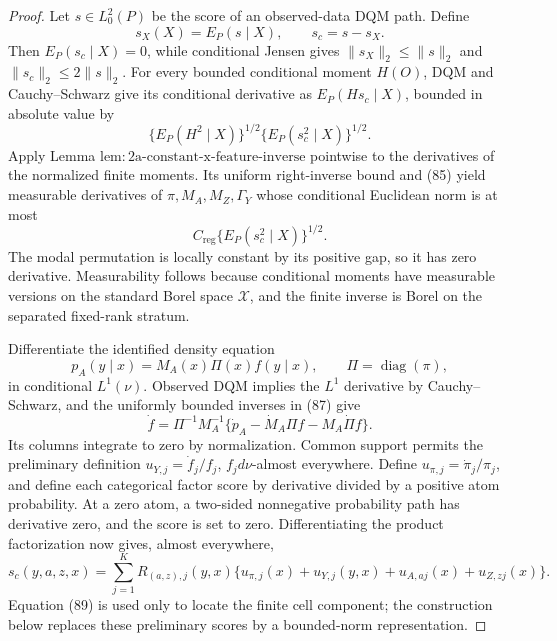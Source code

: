 \documentclass{article}
\begin{document}
\begin{proof}
Let \(s\in L^2_0(P)\) be the score of an observed-data DQM path.  Define
\[
 s_X(X)=E_P(s\mid X),\qquad s_c=s-s_X. \tag{84}
\]
Then \(E_P(s_c\mid X)=0\), while conditional Jensen gives
\(\|s_X\|_2\leq\|s\|_2\) and \(\|s_c\|_2\leq2\|s\|_2\).  For every bounded conditional moment \(H(O)\), DQM and Cauchy--Schwarz give its conditional derivative as \(E_P(Hs_c\mid X)\), bounded in absolute value by
\[
 \{E_P(H^2\mid X)\}^{1/2}\{E_P(s_c^2\mid X)\}^{1/2}. \tag{85}
\]
Apply Lemma \(\mathrm{lem{:}2a\mbox{-}constant\mbox{-}x\mbox{-}feature\mbox{-}inverse}\) pointwise to the derivatives of the normalized finite moments.  Its uniform right-inverse bound and (85) yield measurable derivatives of \(\pi,M_A,M_Z,\Gamma_Y\) whose conditional Euclidean norm is at most
\[
 C_{\mathrm{reg}}\{E_P(s_c^2\mid X)\}^{1/2}. \tag{86}
\]
The modal permutation is locally constant by its positive gap, so it has zero derivative.  Measurability follows because conditional moments have measurable versions on the standard Borel space \(\mathcal X\), and the finite inverse is Borel on the separated fixed-rank stratum.

Differentiate the identified density equation
\[
 p_A(y\mid x)=M_A(x)\Pi(x)f(y\mid x),\qquad
 \Pi=\operatorname{diag}(\pi), \tag{87}
\]
in conditional \(L^1(\nu)\).  Observed DQM implies the \(L^1\) derivative by Cauchy--Schwarz, and the uniformly bounded inverses in (87) give
\[
 \dot f=\Pi^{-1}M_A^{-1}
 \{\dot p_A-\dot M_A\Pi f-M_A\dot\Pi f\}. \tag{88}
\]
Its columns integrate to zero by normalization.  Common support permits the preliminary definition \(u_{Y,j}=\dot f_j/f_j\), \(f_jd\nu\)-almost everywhere.  Define \(u_{\pi,j}=\dot\pi_j/\pi_j\), and define each categorical factor score by derivative divided by a positive atom probability.  At a zero atom, a two-sided nonnegative probability path has derivative zero, and the score is set to zero.  Differentiating the product factorization now gives, almost everywhere,
\[
 s_c(y,a,z,x)=\sum_{j=1}^KR_{(a,z),j}(y,x)
 \{u_{\pi,j}(x)+u_{Y,j}(y,x)+u_{A,aj}(x)+u_{Z,zj}(x)\}. \tag{89}
\]
Equation (89) is used only to locate the finite cell component; the construction below replaces these preliminary scores by a bounded-norm representation.


\end{proof}
\end{document}
